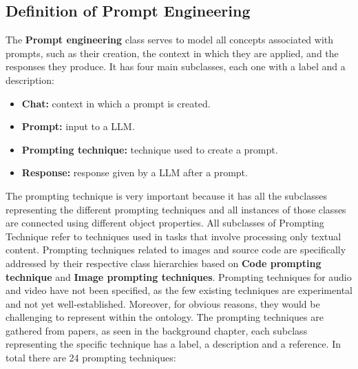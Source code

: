 \subsection{Definition of Prompt Engineering}
\label{subsection:4_3_5_prompt}
The \textbf{Prompt engineering} class serves to model all concepts associated with prompts, such as their creation, the context in which they are applied, and the responses they produce.
It has four main subclasses, each one with a label and a description:
\begin{itemize}
    \item \textbf{Chat:} context in which a prompt is created. 
    \item \textbf{Prompt:} input to a LLM.
    \item \textbf{Prompting technique:} technique used to create a prompt.
    \item \textbf{Response:} response given by a LLM after a prompt.
\end{itemize}
The prompting technique is very important because it has all the subclasses representing the different prompting techniques and all instances of those classes are connected using different object properties.
All subclasses of Prompting Technique refer to techniques used in tasks that involve processing only textual content.
Prompting techniques related to images and source code are specifically addressed by their respective class hierarchies based on \textbf{Code prompting technique} and \textbf{Image prompting techniques}.
Prompting techniques for audio and video have not been specified, as the few existing techniques are experimental and not yet well-established. Moreover, for obvious reasons, they would be challenging to represent within the ontology. The prompting techniques are gathered from papers, as seen in the background chapter, each subclass representing the specific technique has a label, a description and a reference. In total there are 24 prompting techniques:
